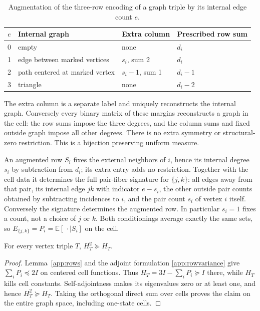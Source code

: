 \begin{table}[ht]
\centering
\begin{tabular}{c l l l}
\toprule
$e$ & Internal graph & Extra column & Prescribed row sum\\
\midrule
0 & empty & none & $d_i$\\
1 & edge between marked vertices & $s_i$, sum 2 & $d_i$\\
2 & path centered at marked vertex & $s_i-1$, sum 1 & $d_i-1$\\
3 & triangle & none & $d_i-2$\\
\bottomrule
\end{tabular}
\caption{Augmentation of the three-row encoding of a graph triple by its
internal edge count $e$.}
\label{app:encoding}
\end{table}

The extra column is a separate label and uniquely reconstructs the internal
graph. Conversely every binary matrix of these margins reconstructs a graph
in the cell: the row sums impose the three degrees, and the column sums and
fixed outside graph impose all other degrees. There is no extra symmetry or
structural-zero restriction. This is a bijection preserving uniform measure.

An augmented row $S_i$ fixes the external neighbors of $i$, hence its
internal degree $s_i$ by subtraction from $d_i$; its extra entry adds no
restriction. Together with the cell data it determines the full pair-fiber
signature for $\{j,k\}$: all edges away from that pair, its internal edge
$jk$ with indicator $e-s_i$, the other outside pair counts obtained by
subtracting incidences to $i$, and the pair count $s_i$ of vertex $i$ itself.
Conversely the signature determines the augmented row. In particular $s_i=1$
fixes a count, not a choice of $j$ or $k$. Both conditionings average exactly
the same sets, so $E_{\{j,k\}}=P_i=\mathbb E[\,\cdot\mid S_i]$ on the cell.

\begin{lemma}\label{app:triple}
For every vertex triple $T$, $H_T^2\succeq H_T$.
\end{lemma}
\begin{proof}
Lemma~\ref{app:rows} and the adjoint formulation \eqref{app:rowvariance}
give $\sum_iP_i\preceq2I$ on centered cell functions. Thus
$H_T=3I-\sum_iP_i\succeq I$ there, while $H_T$ kills cell constants.
Self-adjointness makes its eigenvalues zero or at least one, and hence
$H_T^2\succeq H_T$. Taking the orthogonal direct sum over cells proves the
claim on the entire graph space, including one-state cells.
\end{proof}
